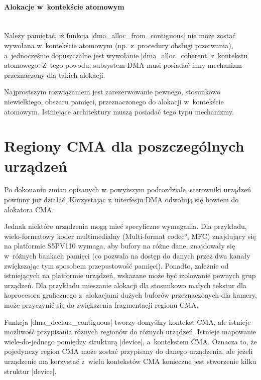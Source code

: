 \paragraph{Alokacje w~kontekście atomowym} \hspace{0pt} \\

Należy pamiętać, iż funkcja \code|dma_alloc_from_contiguous|
nie może zostać wywołana w~kontekście atomowym (np.\ z~procedury
obsługi przerwania), a~jednocześnie dopuszczalne jest wywołanie
\code|dma_alloc_coherent| z~kontekstu atomowego.  Z~tego
powodu, subsystem DMA musi posiadać inny mechanizm przeznaczony dla
takich alokacji.

Najprostszym rozwiązaniem jest zarezerwowanie pewnego, stosunkowo
niewielkiego, obszaru pamięci, przeznaczonego do alokacji w~kontekście
atomowym.  Istniejące architektury muszą posiadać tego typu
mechanizmy.


\section{Regiony CMA dla poszczególnych urządzeń}\label{sec:priv-regions}

Po dokonaniu zmian opisanych w~powyższym podrozdziale, sterowniki
urządzeń powinny już działać.  Korzystając z~interfesju DMA odwołują
się bowiem do alokatora CMA.

Jednak niektóre urządzenia mogą mieć specyficzne wymagania.  Dla
przykładu, wielo-formatowy koder multimedialny (\ang{Multi-format
  codec}, MFC) znajdujący się na platformie S5PV110 wymaga, aby bufory
na różne dane, znajdowały się w~różnych bankach pamięci (co pozwala na
dostęp do danych przez dwa kanały zwiększając tym sposobem
przepustowość pamięci).  Ponadto, zależnie od istniejących na
platformie urządzeń, wskazane może być izolowanie pewnych grup
urządzeń.  Dla przykładu mieszanie alokacji dla stosunkowo małych
tekstur dla koprocesora graficznego z~alokacjami dużych buforów
przeznaczonych dla kamery, może przyczynić się do zwiększenia
fragmentacji regionu CMA.

Funkcja \code|dma_declare_contiguous| tworzy domyślny kontekst CMA,
ale istnieje możliwość przypisania różnych regionów do różnych
urządzeń.  Istnieje mapowanie wiele-do-jednego pomiędzy strukturą
\code|device|, a~kontekstem CMA.  Oznacza to, że pojedynczy region CMA
może zostać przypisany do danego urządzenia, ale jeżeli urządzenie ma
korzystać z~wielu kontekstów CMA konieczne jest stworzenie kilku
struktur \code|device|.

